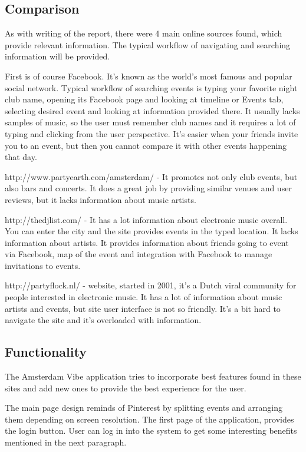 \documentclass[12pt, a4paper, lithuanian]{article}
\begin{document}
\subsection{Comparison}

  As with writing of the report, there were 4 main online sources found, which provide relevant information. The typical workflow of navigating and searching information will be provided.

  First is of course Facebook. It's known as the world's most famous and popular social network. Typical workflow of searching events is typing your favorite night club name, opening its Facebook page and looking at timeline or Events tab, selecting desired event and looking at information provided there. It usually lacks samples of music, so the user must remember club names and it requires a lot of typing and clicking from the user perspective. It's easier when your friends invite you to an event, but then you cannot compare it with other events happening that day.

  http://www.partyearth.com/amsterdam/ - It promotes not only club events, but also bars and concerts. It does a great job by providing similar venues and user reviews, but it lacks information about music artists.

  http://thedjlist.com/ - It has a lot information about electronic music overall. You can enter the city and the site provides events in the typed location. It lacks information about artists. It provides information about friends going to event via Facebook, map of the event and integration with Facebook to manage invitations to events. 

  http://partyflock.nl/ - website, started in 2001, it's a Dutch viral community for people interested in electronic music. It has a lot of information about music artists and events, but site user interface is not so friendly. It's a bit hard to navigate the site and it's overloaded with information.

\subsection{Functionality}

  The Amsterdam Vibe application tries to incorporate best features found in these sites and add new ones to provide the best experience for the user.

  The main page design reminds of Pinterest by splitting events and arranging them depending on screen resolution. The first page of the application, provides the login button. User can log in into the system to get some interesting benefits mentioned in the next paragraph.
\end{document}
